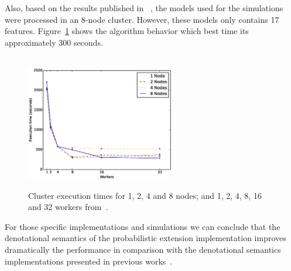 Also, based on the results published in \fodaPAc~\cite{clc16},
the models used for the simulations were processed in
an 8-node cluster. However, these models only contains 17 features.
Figure~\ref{fig:cluster} shows the algorithm behavior
which best time its approximately 300 seconds.

\begin{figure}[t]
        \centering
        \linefigure
        \\
        \includegraphics[width=0.7\hsize, height=5cm,angle=0]{plot_cluster.eps}
        \linefigure
        \caption{Cluster execution times for 1, 2, 4 and 8 nodes; and 1, 2, 4, 8, 16 and 32 workers  from~\cite{clc16}.}\label{fig:cluster}
\end{figure}

For those specific implementations and
simulations we can conclude
that the denotational semantics of the probabilistic
extension implementation improves dramatically
the performance
in comparison with the denotational semantics implementations
presented in previous works~\cite{acl13,clc16}.


